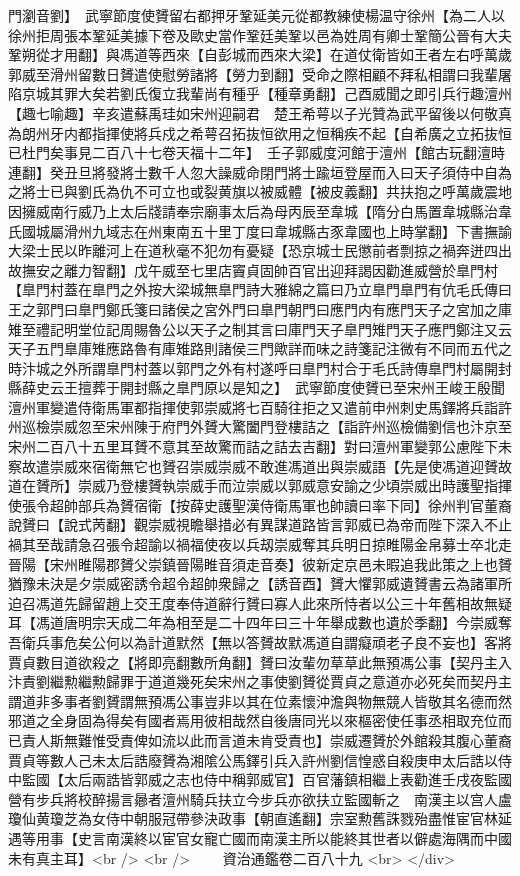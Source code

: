 門瀏音劉】　武寧節度使贇留右都押牙鞏延美元從都教練使楊温守徐州【為二人以徐州拒周張本鞏延美據下卷及歐史當作鞏廷美鞏以邑為姓周有卿士鞏簡公晉有大夫鞏朔從才用翻】與馮道等西來【自彭城而西來大梁】在道仗衛皆如王者左右呼萬歲郭威至滑州留數日贇遣使慰勞諸將【勞力到翻】受命之際相顧不拜私相謂曰我輩屠陷京城其罪大矣若劉氏復立我輩尚有種乎【種章勇翻】己酉威聞之即引兵行趣澶州【趣七喻趣】辛亥遣蘇禹珪如宋州迎嗣君　楚王希萼以子光贊為武平留後以何敬真為朗州牙内都指揮使將兵戍之希萼召拓抜恒欲用之恒稱疾不起【自希廣之立拓抜恒已杜門矣事見二百八十七卷天福十二年】　壬子郭威度河館于澶州【館古玩翻澶時連翻】癸丑旦將發將士數千人忽大譟威命閉門將士踰垣登屋而入曰天子須侍中自為之將士已與劉氏為仇不可立也或裂黄旗以被威體【被皮義翻】共扶抱之呼萬歲震地因擁威南行威乃上太后牋請奉宗廟事太后為母丙辰至韋城【隋分白馬置韋城縣治韋氏國城屬滑州九域志在州東南五十里丁度曰韋城縣古豕韋國也上時掌翻】下書撫諭大梁士民以昨離河上在道秋毫不犯勿有憂疑【恐京城士民懲前者剽掠之禍奔迸四出故撫安之離力智翻】戊午威至七里店竇貞固帥百官出迎拜謁因勸進威營於臯門村【臯門村蓋在臯門之外按大梁城無臯門詩大雅綿之篇曰乃立臯門臯門有伉毛氏傳曰王之郭門曰臯門鄭氏箋曰諸侯之宮外門曰臯門朝門曰應門内有應門天子之宮加之庫雉至禮記明堂位記周賜魯公以天子之制其言曰庫門天子臯門雉門天子應門鄭注又云天子五門臯庫雉應路魯有庫雉路則諸侯三門歟詳而味之詩箋記注微有不同而五代之時汴城之外所謂臯門村蓋以郭門之外有村遂呼曰臯門村合于毛氏詩傳臯門村屬開封縣薛史云王擅葬于開封縣之臯門原以是知之】　武寧節度使贇已至宋州王峻王殷聞澶州軍變遣侍衛馬軍都指揮使郭崇威將七百騎往拒之又遣前申州刺史馬鐸將兵詣許州巡檢崇威忽至宋州陳于府門外贇大驚闔門登樓詰之【詣許州巡檢備劉信也汴京至宋州二百八十五里耳贇不意其至故驚而詰之詰去吉翻】對曰澶州軍變郭公慮陛下未察故遣崇威來宿衛無它也贇召崇威崇威不敢進馮道出與崇威語【先是使馮道迎贇故道在贇所】崇威乃登樓贇執崇威手而泣崇威以郭威意安諭之少頃崇威出時護聖指揮使張令超帥部兵為贇宿衛【按薛史護聖漢侍衛馬軍也帥讀曰率下同】徐州判官董裔說贇曰【說式苪翻】觀崇威視瞻舉措必有異謀道路皆言郭威已為帝而陛下深入不止禍其至哉請急召張令超諭以禍福使夜以兵刼崇威奪其兵明日掠睢陽金帛募士卒北走晉陽【宋州睢陽郡贇父崇鎮晉陽睢音須走音奏】彼新定京邑未暇追我此策之上也贇猶豫未決是夕崇威密誘令超令超帥衆歸之【誘音酉】贇大懼郭威遺贇書云為諸軍所迫召馮道先歸留趙上交王度奉侍道辭行贇曰寡人此來所恃者以公三十年舊相故無疑耳【馮道唐明宗天成二年為相至是二十四年曰三十年舉成數也遺於季翻】今崇威奪吾衛兵事危矣公何以為計道默然【無以答贇故默馮道自謂癡頑老子良不妄也】客將賈貞數目道欲殺之【將即亮翻數所角翻】贇曰汝輩勿草草此無預馮公事【契丹主入汴責劉繼勲繼勲歸罪于道道幾死矣宋州之事使劉贇從賈貞之意道亦必死矣而契丹主謂道非多事者劉贇謂無預馮公事豈非以其在位素懷沖澹與物無競人皆敬其名德而然邪道之全身固為得矣有國者焉用彼相哉然自後唐同光以來樞密使任事丞相取充位而已責人斯無難惟受責俾如流以此而言道未肯受責也】崇威遷贇於外館殺其腹心董裔賈貞等數人己未太后誥廢贇為湘隂公馬鐸引兵入許州劉信惶惑自殺庚申太后誥以侍中監國【太后兩誥皆郭威之志也侍中稱郭威官】百官藩鎮相繼上表勸進壬戌夜監國營有步兵將校醉揚言曏者澶州騎兵扶立今步兵亦欲扶立監國斬之　南漢主以宫人盧瓊仙黄瓊芝為女侍中朝服冠帶參決政事【朝直遙翻】宗室勲舊誅戮殆盡惟宦官林延遇等用事【史言南漢終以宦官女寵亡國而南漢主所以能終其世者以僻處海隅而中國未有真主耳】<br />
<br />
　　資治通鑑卷二百八十九  <br>
   </div> 

